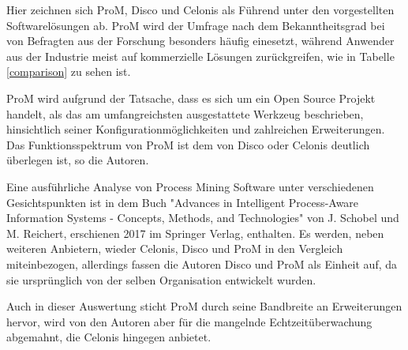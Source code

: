 Hier zeichnen sich ProM, Disco und Celonis als Führend unter den vorgestellten Softwarelösungen ab. ProM wird der Umfrage nach dem Bekanntheitsgrad bei von Befragten aus der Forschung besonders häufig einesetzt, während Anwender aus der Industrie meist auf kommerzielle Lösungen zurückgreifen, wie in Tabelle \ref{comparison} zu sehen ist.

\begin{table}[!h]
\centering
{}
\caption{Angaben von Anwendern zu ihrem Umgang mit Process Mining Software (Quelle: Auszug aus Tabelle 5: Fragenkatalog 5, Verstraete, Comparative Study of Process Mining Software, S. 29 \cite{compPM} }
\label{comparison}
\end{table}

\normalsize
ProM wird aufgrund der Tatsache, dass es sich um ein Open Source Projekt handelt, als das am umfangreichsten ausgestattete Werkzeug beschrieben, hinsichtlich seiner Konfigurationmöglichkeiten und zahlreichen Erweiterungen. Das Funktionsspektrum von ProM ist dem von Disco oder Celonis deutlich überlegen ist, so die Autoren. 

Eine ausführliche Analyse von Process Mining Software unter verschiedenen Gesichtspunkten ist in dem Buch "Advances in Intelligent Process-Aware Information Systems - Concepts, Methods, and Technologies" von J. Schobel und M.  Reichert, erschienen 2017 im Springer Verlag, enthalten\cite{Schobel2017}. Es werden, neben weiteren Anbietern, wieder Celonis, Disco und ProM in den Vergleich miteinbezogen, allerdings fassen die Autoren Disco und ProM als Einheit auf, da sie ursprünglich von der selben Organisation entwickelt wurden. 

Auch in dieser Auswertung sticht ProM durch seine Bandbreite an Erweiterungen hervor, wird von den Autoren aber für die mangelnde Echtzeitüberwachung abgemahnt, die Celonis hingegen anbietet.


